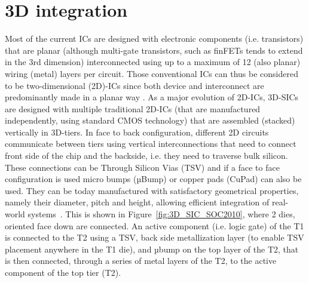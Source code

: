 %
%
%
%

\section{3D integration}

Most of the current ICs are designed with electronic components (i.e. transistors) that are planar (although multi-gate transistors, such as finFETs tends to extend in the 3rd dimension) interconnected using up to a maximum of 12 (also planar) wiring (metal) layers per circuit. Those conventional ICs can thus be considered to be two-dimensional (2D)-ICs since both device and interconnect are predominantly made in a planar way \cite{1393404,fujitsu08}. As a major evolution of 2D-ICs, 3D-SICs are designed with multiple traditional 2D-ICs (that are manufactured independently, using standard CMOS technology) that are assembled (stacked) vertically in 3D-tiers. In face to back configuration, different 2D circuits communicate between tiers using vertical interconnections that need to connect front side of the chip and the backside, i.e. they need to traverse bulk silicon. These connections can be Through Silicon Vias (TSV) and if a face to face configuration is used micro bumps (µBump) or copper pads (CuPad) can also be used. They can be today manufactured with satisfactory geometrical properties, namely their diameter, pitch and height, allowing efficient integration of real-world systems~\cite{1705326,5746413}. This is shown in Figure~\ref{fig:3D_SIC_SOC2010}, where 2 dies, oriented face down are connected. An active component (i.e. logic gate) of the T1 is connected to the T2 using a TSV, back side metallization layer (to enable TSV placement anywhere in the T1 die), and µbump on the top layer of the T2, that is then connected, through a series of metal layers of the T2, to the active component of the top tier (T2).

